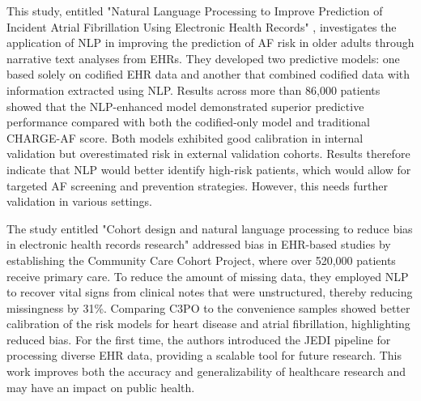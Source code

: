 This study, entitled "Natural Language Processing to Improve Prediction of Incident Atrial Fibrillation Using Electronic Health Records"\cite{doi:10.1161/JAHA.122.026014} , investigates the application of NLP in improving the prediction of AF risk in older adults through narrative text analyses from EHRs. They developed two predictive models: one based solely on codified EHR data and another that combined codified data with information extracted using NLP. Results across more than 86,000 patients showed that the NLP-enhanced model demonstrated superior predictive performance compared with both the codified-only model and traditional CHARGE-AF score. Both models exhibited good calibration in internal validation but overestimated risk in external validation cohorts. Results therefore indicate that NLP would better identify high-risk patients, which would allow for targeted AF screening and prevention strategies. However, this needs further validation in various settings.
\vspace{0.5cm}

The study entitled "Cohort design and natural language processing to reduce bias in electronic health records research" addressed bias in EHR-based studies by establishing the Community Care Cohort Project, where over 520,000 patients receive primary care. To reduce the amount of missing data, they employed NLP to recover vital signs from clinical notes that were unstructured, thereby reducing missingness by 31\%. Comparing C3PO to the convenience samples showed better calibration of the risk models for heart disease and atrial fibrillation, highlighting reduced bias. For the first time, the authors introduced the JEDI pipeline for processing diverse EHR data, providing a scalable tool for future research. This work improves both the accuracy and generalizability of healthcare research and may have an impact on public health.
\vspace{0.5cm}

